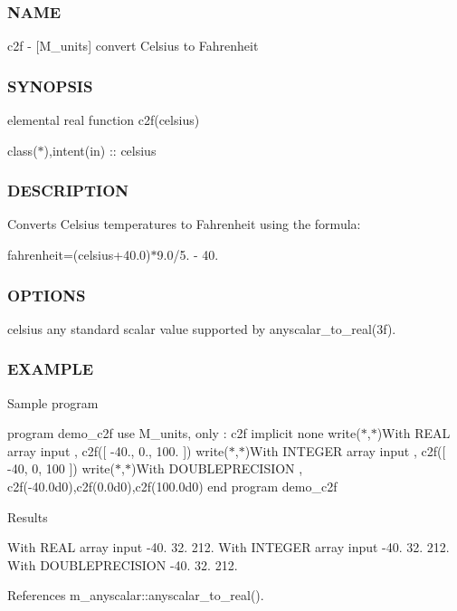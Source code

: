 \subsubsection*{N\+A\+ME}

c2f -\/ \mbox{[}M\+\_\+units\mbox{]} convert Celsius to Fahrenheit \subsubsection*{S\+Y\+N\+O\+P\+S\+IS}

elemental real function c2f(celsius)

class($\ast$),intent(in) \+:\+: celsius \subsubsection*{D\+E\+S\+C\+R\+I\+P\+T\+I\+ON}

Converts Celsius temperatures to Fahrenheit using the formula\+:

fahrenheit=(celsius+40.0)$\ast$9.0/5. -\/ 40. \subsubsection*{O\+P\+T\+I\+O\+NS}

celsius any standard scalar value supported by anyscalar\+\_\+to\+\_\+real(3f). \subsubsection*{E\+X\+A\+M\+P\+LE}

Sample program

program demo\+\_\+c2f use M\+\_\+units, only \+: c2f implicit none write($\ast$,$\ast$)\textquotesingle{}With R\+E\+AL array input \textquotesingle{}, c2f(\mbox{[} -\/40., 0., 100. \mbox{]}) write($\ast$,$\ast$)\textquotesingle{}With I\+N\+T\+E\+G\+ER array input \textquotesingle{}, c2f(\mbox{[} -\/40, 0, 100 \mbox{]}) write($\ast$,$\ast$)\textquotesingle{}With D\+O\+U\+B\+L\+E\+P\+R\+E\+C\+I\+S\+I\+ON \textquotesingle{}, c2f(-\/40.\+0d0),c2f(0.\+0d0),c2f(100.\+0d0) end program demo\+\_\+c2f

Results

With R\+E\+AL array input -\/40. 32. 212. With I\+N\+T\+E\+G\+ER array input -\/40. 32. 212. With D\+O\+U\+B\+L\+E\+P\+R\+E\+C\+I\+S\+I\+ON -\/40. 32. 212. 

References m\+\_\+anyscalar\+::anyscalar\+\_\+to\+\_\+real().

